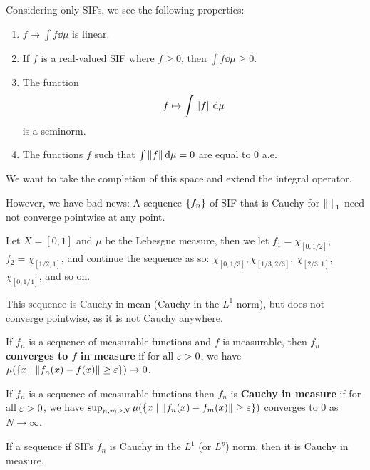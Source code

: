 Considering only SIFs, we see the following properties:

\begin{proposition}
    \begin{enumerate}
        \item $f \mapsto \int f\dd{\mu}$ is linear.
        \item If $f$ is a real-valued SIF where $f \ge 0$, then $\int f\dd{\mu} \ge 0$.
        \item The function \[f \mapsto \int \norm{f} \dd{\mu}\] is a seminorm.
        \item The functions $f$ such that $\int \norm{f} \dd{\mu} = 0$ are equal to $0$ a.e.
    \end{enumerate}
\end{proposition}

We want to take the completion of this space and extend the integral operator.

However, we have bad news: A sequence $\qty{f_n}$ of SIF that is Cauchy for $\norm{\cdot}_1$ need not converge pointwise at any point.

\begin{example}
    Let $X = [0, 1]$ and $\mu$ be the Lebesgue measure, then we let $f_1 = \chi_{[0, 1/2]}$, $f_2 = \chi_{[1/2, 1]}$, and continue the sequence as so: $\chi_{[0, 1/3]}, \chi_{[1/3, 2/3]}$, $\chi_{[2/3, 1]}$, $\chi_{[0, 1/4]}$, and so on.

    This sequence is Cauchy in mean (Cauchy in the $L^1$ norm), but does not converge pointwise, as it is not Cauchy anywhere.
\end{example}

\begin{definition}
    If $f_n$ is a sequence of measurable functions and $f$ is measurable, then $f_n$ \textbf{converges to $f$ in measure} if for all $\varepsilon > 0$, we have $\mu\qty(\qty{x \mid \norm{f_n(x) - f(x)} \ge \varepsilon}) \to 0$.
\end{definition}

\begin{definition}
    If $f_n$ is a sequence of measurable functions then $f_n$ is \textbf{Cauchy in measure} if for all $\varepsilon > 0$, we have $\sup_{n, m \ge N}\mu\qty(\qty{x \mid \norm{f_n(x) - f_m(x)} \ge \varepsilon})$ converges to $0$ as $N \to \infty$.
\end{definition}

\begin{proposition}
    If a sequence if SIFs $f_n$ is Cauchy in the $L^1$ (or $L^p$) norm, then it is Cauchy in measure.
\end{proposition}

